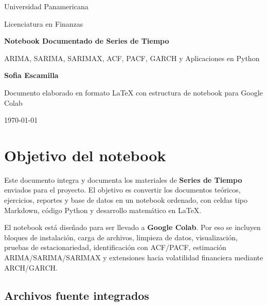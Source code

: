 \documentclass[12pt,a4paper]{article}
\begin{document}
\begin{titlepage}
    \centering
    \vspace*{2cm}
    {\Large Universidad Panamericana \par}
    \vspace{0.5cm}
    {\large Licenciatura en Finanzas \par}
    \vspace{2cm}
    {\Huge\bfseries Notebook Documentado de Series de Tiempo \par}
    \vspace{0.5cm}
    {\Large ARIMA, SARIMA, SARIMAX, ACF, PACF, GARCH y Aplicaciones en Python \par}
    \vspace{2cm}
    {\Large \textbf{Sofia Escamilla} \par}
    \vfill
    {\large Documento elaborado en formato \LaTeX{} con estructura de notebook para Google Colab \par}
    {\large \today \par}
\end{titlepage}

\tableofcontents
\newpage

\section{Objetivo del notebook}

\begin{markdowncell}
Este documento integra y documenta los materiales de \textbf{Series de Tiempo} enviados para el proyecto. 
El objetivo es convertir los documentos teóricos, ejercicios, reportes y base de datos en un notebook ordenado, con celdas tipo Markdown, código Python y desarrollo matemático en \LaTeX.

El notebook está diseñado para ser llevado a \textbf{Google Colab}. Por eso se incluyen bloques de instalación, carga de archivos, limpieza de datos, visualización, pruebas de estacionariedad, identificación con ACF/PACF, estimación ARIMA/SARIMA/SARIMAX y extensiones hacia volatilidad financiera mediante ARCH/GARCH.
\end{markdowncell}

\subsection{Archivos fuente integrados}
\end{document}
